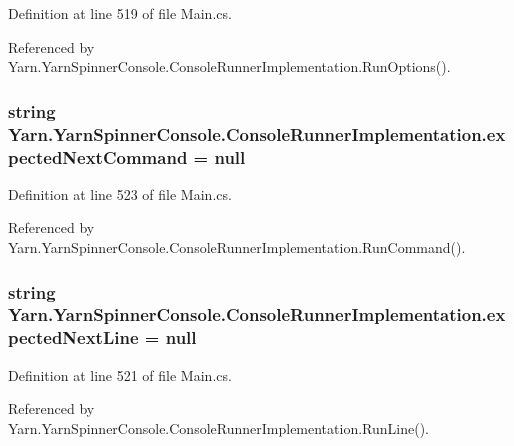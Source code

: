 Definition at line 519 of file Main.\-cs.



Referenced by Yarn.\-Yarn\-Spinner\-Console.\-Console\-Runner\-Implementation.\-Run\-Options().

\hypertarget{a00046_a3c7133c65dc7cf293f49b61426a0c4aa}{
\subsubsection[{expected\-Next\-Command}]{\setlength{\rightskip}{0pt plus 5cm}string Yarn.\-Yarn\-Spinner\-Console.\-Console\-Runner\-Implementation.\-expected\-Next\-Command = null}}\label{a00046_a3c7133c65dc7cf293f49b61426a0c4aa}


Definition at line 523 of file Main.\-cs.



Referenced by Yarn.\-Yarn\-Spinner\-Console.\-Console\-Runner\-Implementation.\-Run\-Command().

\hypertarget{a00046_a33a44e39f2d90850cee234dfad50f2c5}{
\subsubsection[{expected\-Next\-Line}]{\setlength{\rightskip}{0pt plus 5cm}string Yarn.\-Yarn\-Spinner\-Console.\-Console\-Runner\-Implementation.\-expected\-Next\-Line = null}}\label{a00046_a33a44e39f2d90850cee234dfad50f2c5}


Definition at line 521 of file Main.\-cs.



Referenced by Yarn.\-Yarn\-Spinner\-Console.\-Console\-Runner\-Implementation.\-Run\-Line().

